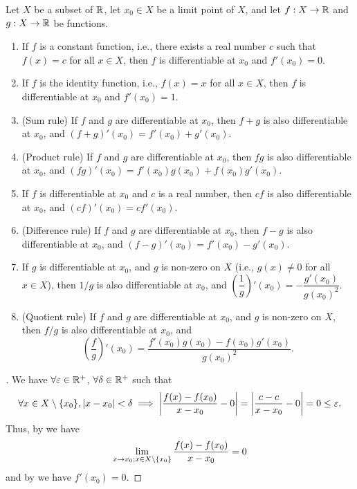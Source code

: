 \begin{thm}\label{i:10.1.13}
  Let \(X\) be a subset of \(\mathbb{R}\), let \(x_0 \in X\) be a limit point of \(X\), and let \(f : X \to \mathbb{R}\) and \(g : X \to \mathbb{R}\) be functions.
  \begin{enumerate}
    \item\label{i:10.1.13.a} If \(f\) is a constant function, i.e., there exists a real number \(c\) such that \(f(x) = c\) for all \(x \in X\), then \(f\) is differentiable at \(x_0\) and \(f'(x_0) = 0\).
    \item\label{i:10.1.13.b} If \(f\) is the identity function, i.e., \(f(x) = x\) for all \(x \in X\), then \(f\) is differentiable at \(x_0\) and \(f'(x_0) = 1\).
    \item\label{i:10.1.13.c} (Sum rule)
    If \(f\) and \(g\) are differentiable at \(x_0\), then \(f + g\) is also differentiable at \(x_0\), and \((f + g)'(x_0) = f'(x_0) + g'(x_0)\).
    \item\label{i:10.1.13.d} (Product rule)
    If \(f\) and \(g\) are differentiable at \(x_0\), then \(fg\) is also differentiable at \(x_0\), and \((fg)'(x_0) = f'(x_0)g(x_0) + f(x_0)g'(x_0)\).
    \item\label{i:10.1.13.e} If \(f\) is differentiable at \(x_0\) and \(c\) is a real number, then \(cf\) is also differentiable at \(x_0\), and \((cf)'(x_0) = cf'(x_0)\).
    \item\label{i:10.1.13.f} (Difference rule)
    If \(f\) and \(g\) are differentiable at \(x_0\), then \(f - g\) is also differentiable at \(x_0\), and \((f - g)'(x_0) = f'(x_0) - g'(x_0)\).
    \item\label{i:10.1.13.g} If \(g\) is differentiable at \(x_0\), and \(g\) is non-zero on \(X\) (i.e., \(g(x) \neq 0\) for all \(x \in X\)), then \(1 / g\) is also differentiable at \(x_0\), and \((\dfrac{1}{g})'(x_0) = -\dfrac{g'(x_0)}{g(x_0)^2}\).
    \item\label{i:10.1.13.h} (Quotient rule)
    If \(f\) and \(g\) are differentiable at \(x_0\), and \(g\) is non-zero on \(X\), then \(f / g\) is also differentiable at \(x_0\), and
    \[
      (\dfrac{f}{g})'(x_0) = \dfrac{f'(x_0) g(x_0) - f(x_0) g'(x_0)}{g(x_0)^2}.
    \]
  \end{enumerate}
\end{thm}

\begin{proof}[]
  We have \(\forall \varepsilon \in \mathbb{R}^+\), \(\forall \delta \in \mathbb{R}^+\) such that
  \[
    \forall x \in X \setminus \set{x_0}, \abs{x - x_0} < \delta \implies \abs{\dfrac{f(x) - f(x_0)}{x - x_0} - 0} = \abs{\dfrac{c - c}{x - x_0} - 0} = 0 \leq \varepsilon.
  \]
  Thus, by  we have
  \[
    \lim_{x \to x_0 ; x \in X \setminus \left\lbrace x_0\right\rbrace} \dfrac{f(x) - f(x_0)}{x - x_0} = 0
  \]
  and by  we have \(f'(x_0) = 0\).
\end{proof}

